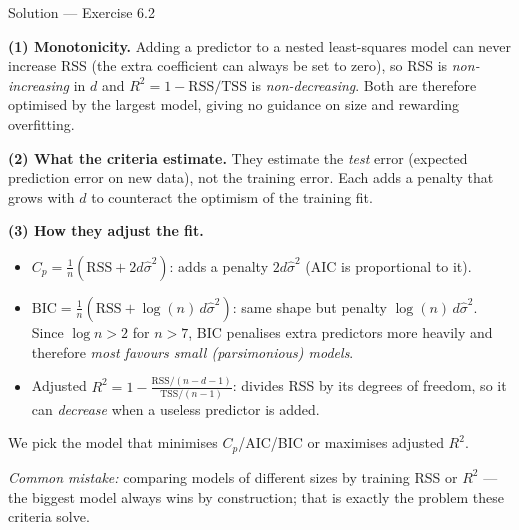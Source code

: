 \documentclass[aspectratio=169,11pt]{beamer}
\begin{document}
\begin{frame}{Solution --- Exercise 6.2}
  \begin{solutionbox}
    \scriptsize
    \textbf{(1) Monotonicity.}
    Adding a predictor to a nested least-squares model can never
    increase RSS (the extra coefficient can always be set to zero), so
    RSS is \emph{non-increasing} in $d$ and $R^2 = 1 - \mathrm{RSS}/
    \mathrm{TSS}$ is \emph{non-decreasing}. Both are therefore optimised
    by the largest model, giving no guidance on size and rewarding
    overfitting.

    \textbf{(2) What the criteria estimate.}
    They estimate the \emph{test} error (expected prediction error on
    new data), not the training error. Each adds a penalty that grows
    with $d$ to counteract the optimism of the training fit.

    \textbf{(3) How they adjust the fit.}
    \begin{itemize}
      \item $C_p = \tfrac1n(\mathrm{RSS} + 2 d\hat\sigma^2)$: adds a
            penalty $2d\hat\sigma^2$ (AIC is proportional to it).
      \item $\mathrm{BIC} = \tfrac1n(\mathrm{RSS} + \log(n)\,
            d\hat\sigma^2)$: same shape but penalty $\log(n)\,
            d\hat\sigma^2$. Since $\log n > 2$ for $n > 7$, BIC
            penalises extra predictors more heavily and therefore
            \emph{most favours small (parsimonious) models}.
      \item Adjusted $R^2 = 1 - \tfrac{\mathrm{RSS}/(n-d-1)}
            {\mathrm{TSS}/(n-1)}$: divides RSS by its degrees of
            freedom, so it can \emph{decrease} when a useless predictor
            is added.
    \end{itemize}
    We pick the model that minimises $C_p$/AIC/BIC or maximises
    adjusted $R^2$.

    \smallskip
    \textit{Common mistake:} comparing models of different sizes by
    training RSS or $R^2$ --- the biggest model always wins by
    construction; that is exactly the problem these criteria solve.
  \end{solutionbox}
\end{frame}
\end{document}
